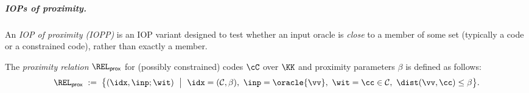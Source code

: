 


\subparagraph{IOPs of proximity.}
An \emph{IOP of proximity (IOPP)} is an IOP variant designed to test whether an input oracle is \emph{close} to a member of some set (typically a code or a constrained code), rather than exactly a member.

\begin{definition}
\label{def:zinc-crypto-proximity_relation}
The \emph{proximity relation} $\REL_{\mathsf{prox}}$ for (possibly constrained) codes $\cC$ over $\KK$ and proximity parameters $\beta$ is defined as follows:
\[
  \REL_{\mathsf{prox}}
  \;:=\;
  \bigl\{(\idx,\inp;\wit)\ \bigm|\ \idx = (\mathcal{C},\beta),\ \inp = \oracle{\vv},\ \wit = \cc \in \mathcal{C},\ \dist(\vv,\cc) \le \beta\bigr\}.
\]
\end{definition}

